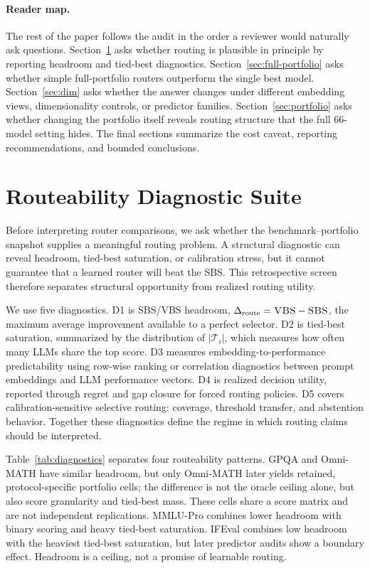\documentclass{article}
\newcommand{\sbs}{\textsc{SBS}}
\newcommand{\vbs}{\textsc{VBS}}
\newcommand{\headroom}{\Delta_{\text{route}}}
\newcommand{\tieset}{\mathcal{T}_i}
\begin{document}
\paragraph{Reader map.}
The rest of the paper follows the audit in the order a reviewer would naturally ask questions. Section~\ref{sec:diagnostics} asks whether routing is plausible in principle by reporting headroom and tied-best diagnostics. Section~\ref{sec:full-portfolio} asks whether simple full-portfolio routers outperform the single best model. Section~\ref{sec:dim} asks whether the answer changes under different embedding views, dimensionality controls, or predictor families. Section~\ref{sec:portfolio} asks whether changing the portfolio itself reveals routing structure that the full 66-model setting hides. The final sections summarize the cost caveat, reporting recommendations, and bounded conclusions.

\section{Routeability Diagnostic Suite}
\label{sec:diagnostics}

Before interpreting router comparisons, we ask whether the benchmark--portfolio snapshot supplies a meaningful routing problem. A structural diagnostic can reveal headroom, tied-best saturation, or calibration stress, but it cannot guarantee that a learned router will beat the SBS. This retrospective screen therefore separates structural opportunity from realized routing utility.

We use five diagnostics. D1 is SBS/VBS headroom, $\headroom=\vbs-\sbs$, the maximum average improvement available to a perfect selector. D2 is tied-best saturation, summarized by the distribution of $|\tieset|$, which measures how often many LLMs share the top score. D3 measures embedding-to-performance predictability using row-wise ranking or correlation diagnostics between prompt embeddings and LLM performance vectors. D4 is realized decision utility, reported through regret and gap closure for forced routing policies. D5 covers calibration-sensitive selective routing: coverage, threshold transfer, and abstention behavior. Together these diagnostics define the regime in which routing claims should be interpreted.

Table~\ref{tab:diagnostics} separates four routeability patterns. GPQA and Omni-MATH have similar headroom, but only Omni-MATH later yields retained, protocol-specific portfolio cells; the difference is not the oracle ceiling alone, but also score granularity and tied-best mass. These cells share a score matrix and are not independent replications. MMLU-Pro combines lower headroom with binary scoring and heavy tied-best saturation. IFEval combines low headroom with the heaviest tied-best saturation, but later predictor audits show a boundary effect. Headroom is a ceiling, not a promise of learnable routing.
\end{document}
